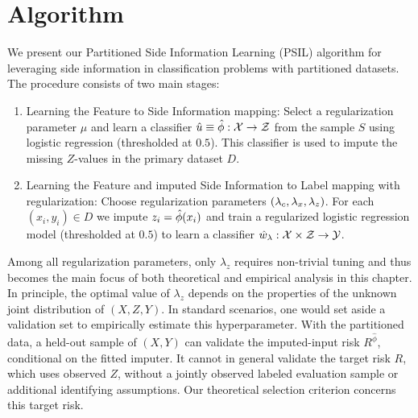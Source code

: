 \section{Algorithm}

We present our Partitioned Side Information Learning (PSIL) algorithm for leveraging side information in classification problems with partitioned datasets. The procedure consists of two main stages:

\begin{enumerate}
    \item Learning the Feature to Side Information mapping:
    Select a regularization parameter $\mu$ and learn a classifier $\hat{u} \equiv \hat{\phi}: \mathcal{X} \rightarrow \mathcal{Z}$ from the sample $S$ using logistic regression (thresholded at $0.5$). This classifier is used to impute the missing $Z$-values in the primary dataset $D$.

    \item Learning the Feature and imputed Side Information to Label mapping with regularization:
    Choose regularization parameters $(\lambda_c, \lambda_x, \lambda_z)$. For each $(x_i, y_i) \in D$ we impute $z_i = \hat{\phi}(x_i)$
    and train a regularized logistic regression model (thresholded at $0.5$) to learn a classifier $\hat{w}_\lambda: \mathcal{X} \times \mathcal{Z} \rightarrow \mathcal{Y}$.
\end{enumerate}

Among all regularization parameters, only $\lambda_z$ requires non-trivial tuning and thus becomes the main focus of both theoretical and empirical analysis in this chapter. In principle, the optimal value of $\lambda_z$ depends on the properties of the unknown joint distribution of $(X, Z, Y)$. In standard scenarios, one would set aside a validation set to empirically estimate this hyperparameter. With the partitioned data, a held-out sample of $(X,Y)$ can validate the imputed-input risk $R^{\hat\phi}$, conditional on the fitted imputer. It cannot in general validate the target risk $R$, which uses observed $Z$, without a jointly observed labeled evaluation sample or additional identifying assumptions. Our theoretical selection criterion concerns this target risk.

